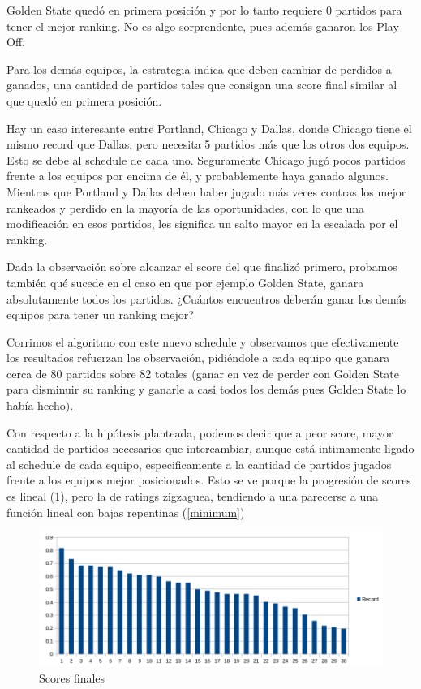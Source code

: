 Golden State qued\'o en primera posici\'on y por lo tanto requiere 0 partidos para tener el mejor ranking. No es algo sorprendente, pues adem\'as ganaron los Play-Off.

Para los dem\'as equipos, la estrategia indica que deben cambiar de perdidos a ganados, una cantidad de partidos tales que consigan una score final similar al que qued\'o en primera posici\'on.

Hay un caso interesante entre Portland, Chicago y Dallas, donde Chicago tiene el mismo record que Dallas, pero necesita 5 partidos m\'as que los otros dos equipos. Esto se debe al schedule de cada uno. Seguramente Chicago jug\'o pocos partidos frente a los equipos por encima de \'el, y probablemente haya ganado algunos. Mientras que Portland y Dallas deben haber jugado m\'as veces contras los mejor rankeados y perdido en la mayor\'ia de las oportunidades, con lo que una modificaci\'on en esos partidos, les significa un salto mayor en la escalada por el ranking.

Dada la observaci\'on sobre alcanzar el score del que finaliz\'o primero, probamos tambi\'en qu\'e sucede en el caso en que por ejemplo Golden State, ganara absolutamente todos los partidos. ¿Cu\'antos encuentros deber\'an ganar los dem\'as equipos para tener un ranking mejor?

Corrimos el algoritmo con este nuevo schedule y observamos que efectivamente
los resultados refuerzan las observaci\'on, pidi\'endole a cada equipo que ganara cerca de 80 partidos sobre 82 totales (ganar en vez de perder con Golden State para disminuir su ranking y ganarle a casi todos los dem\'as pues Golden State lo hab\'ia hecho).

Con respecto a la hip\'otesis planteada, podemos decir que a peor score, mayor cantidad de partidos necesarios que intercambiar, aunque est\'a intimamente ligado al schedule de cada equipo, especificamente a la cantidad de partidos jugados frente a los equipos mejor posicionados. Esto se ve porque la progresi\'on de scores es lineal (\ref{finalScores}), pero la de ratings zigzaguea, tendiendo a una parecerse a una funci\'on lineal con bajas repentinas (\ref{minimum})

\begin{figure}[h!]
  \begin{center}
	\includegraphics[scale=0.50]{imagenes/cualitative/greedy/scores.png}
	\caption{Scores finales}
	\label{finalScores}
  \end{center}
\end{figure}

